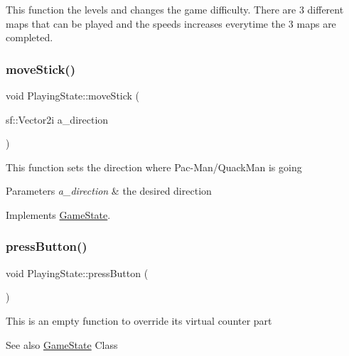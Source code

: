 This function the levels and changes the game difficulty. There are 3 different maps that can be played and the speeds increases everytime the 3 maps are completed. \mbox{\label{class_playing_state_af205fbb130a2c83b260d80359de914e8}} 
\subsubsection{\texorpdfstring{move\+Stick()}{moveStick()}}
{\footnotesize\ttfamily void Playing\+State\+::move\+Stick (\begin{DoxyParamCaption}\item[{sf\+::\+Vector2i}]{a\+\_\+direction }\end{DoxyParamCaption})\hspace{0.3cm}{\ttfamily [virtual]}}

This function sets the direction where Pac-\/\+Man/\+Quack\+Man is going


\begin{DoxyParams}{Parameters}
{\em a\+\_\+direction} & the desired direction \\
\hline
\end{DoxyParams}


Implements \hyperlink{class_game_state_aaae8c1b3ae6969eb2dd81bfc12fbf43f}{Game\+State}.

\mbox{\label{class_playing_state_ae59ff244a6cd4a3c6f6fcaef41f4d8c5}} 
\subsubsection{\texorpdfstring{press\+Button()}{pressButton()}}
{\footnotesize\ttfamily void Playing\+State\+::press\+Button (\begin{DoxyParamCaption}{ }\end{DoxyParamCaption})\hspace{0.3cm}{\ttfamily [virtual]}}

This is an empty function to override it\textquotesingle{}s virtual counter part \begin{DoxySeeAlso}{See also}
\hyperlink{class_game_state}{Game\+State} Class 
\end{DoxySeeAlso}


